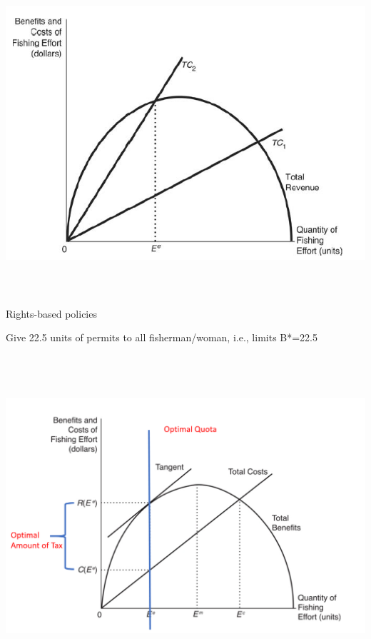 \begin{frame}{}
\protect\hypertarget{section-14}{}

\includegraphics[width=\textwidth,height=4.6875in]{figures/m4_fishing_limit_effort.png}

\end{frame}

\begin{frame}{Rights-based policies}
\protect\hypertarget{rights-based-policies}{}

Give 22.5 units of permits to all fisherman/woman, i.e., limits B*=22.5

\end{frame}

\begin{frame}{}
\protect\hypertarget{section-15}{}

\includegraphics[width=\textwidth,height=4.6875in]{figures/m4_fishery_instrument.png}

\end{frame}

